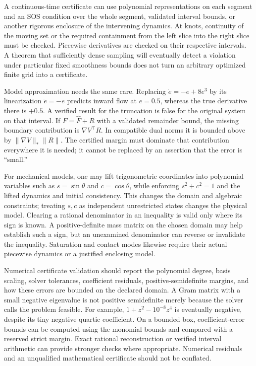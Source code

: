 A continuous-time certificate can use polynomial representations on each segment and an SOS condition over the whole segment, validated interval bounds, or another rigorous enclosure of the intervening dynamics. At knots, continuity of the moving set or the required containment from the left slice into the right slice must be checked. Piecewise derivatives are checked on their respective intervals. A theorem that sufficiently dense sampling will eventually detect a violation under particular fixed smoothness bounds does not turn an arbitrary optimized finite grid into a certificate.

Model approximation needs the same care. Replacing $\dot e=-e+8e^3$ by its linearization $\dot e=-e$ predicts inward flow at $e=0.5$, whereas the true derivative there is $+0.5$. A verified result for the truncation is false for the original system on that interval. If $F=\widehat F+R$ with a validated remainder bound, the missing boundary contribution is $\nabla V^\top R$. In compatible dual norms it is bounded above by $\|\nabla V\|_*\|R\|$. The certified margin must dominate that contribution everywhere it is needed; it cannot be replaced by an assertion that the error is ``small.''

For mechanical models, one may lift trigonometric coordinates into polynomial variables such as $s=\sin\theta$ and $c=\cos\theta$, while enforcing $s^2+c^2=1$ and the lifted dynamics and initial consistency. This changes the domain and algebraic constraints; treating $s,c$ as independent unrestricted states changes the physical model. Clearing a rational denominator in an inequality is valid only where its sign is known. A positive-definite mass matrix on the chosen domain may help establish such a sign, but an unexamined denominator can reverse or invalidate the inequality. Saturation and contact modes likewise require their actual piecewise dynamics or a justified enclosing model.

Numerical certificate validation should report the polynomial degree, basis scaling, solver tolerances, coefficient residuals, positive-semidefinite margins, and how these errors are bounded on the declared domain. A Gram matrix with a small negative eigenvalue is not positive semidefinite merely because the solver calls the problem feasible. For example, $1+z^2-10^{-8}z^4$ is eventually negative, despite its tiny negative quartic coefficient. On a bounded box, coefficient-error bounds can be computed using the monomial bounds and compared with a reserved strict margin. Exact rational reconstruction or verified interval arithmetic can provide stronger checks where appropriate. Numerical residuals and an unqualified mathematical certificate should not be conflated.

